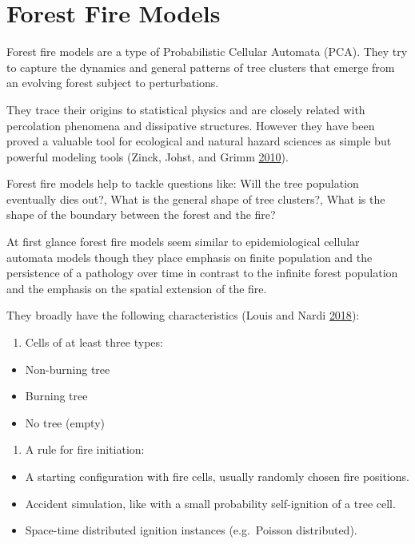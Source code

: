 \documentclass[
]{book}
\providecommand{\tightlist}{%
  \setlength{\itemsep}{0pt}\setlength{\parskip}{0pt}}
\begin{document}
\hypertarget{forest-fire-models}{%
\section{Forest Fire Models}\label{forest-fire-models}}

Forest fire models are a type of Probabilistic Cellular Automata (PCA). They try to capture the dynamics and general patterns of tree clusters that emerge from an evolving forest subject to perturbations.

They trace their origins to statistical physics and are closely related with percolation phenomena and dissipative structures. However they have been proved a valuable tool for ecological and natural hazard sciences as simple but powerful modeling tools (Zinck, Johst, and Grimm \protect\hyperlink{ref-zinck2010wildfire}{2010}).

Forest fire models help to tackle questions like: Will the tree population eventually dies out?, What is the general shape of tree clusters?, What is the shape of the boundary between the forest and the fire?

At first glance forest fire models seem similar to epidemiological cellular automata models though they place emphasis on finite population and the persistence of a pathology over time in contrast to the infinite forest population and the emphasis on the spatial extension of the fire.

They broadly have the following characteristics (Louis and Nardi \protect\hyperlink{ref-louis2018probabilistic}{2018}):

\begin{enumerate}
\def\labelenumi{\arabic{enumi}.}
\tightlist
\item
  Cells of at least three types:
\end{enumerate}

\begin{itemize}
\tightlist
\item
  Non-burning tree
\item
  Burning tree
\item
  No tree (empty)
\end{itemize}

\begin{enumerate}
\def\labelenumi{\arabic{enumi}.}
\setcounter{enumi}{1}
\tightlist
\item
  A rule for fire initiation:
\end{enumerate}

\begin{itemize}
\tightlist
\item
  A starting configuration with fire cells, usually randomly chosen fire positions.
\item
  Accident simulation, like with a small probability self-ignition of a tree cell.
\item
  Space-time distributed ignition instances (e.g.~Poisson distributed).
\end{itemize}
\end{document}

